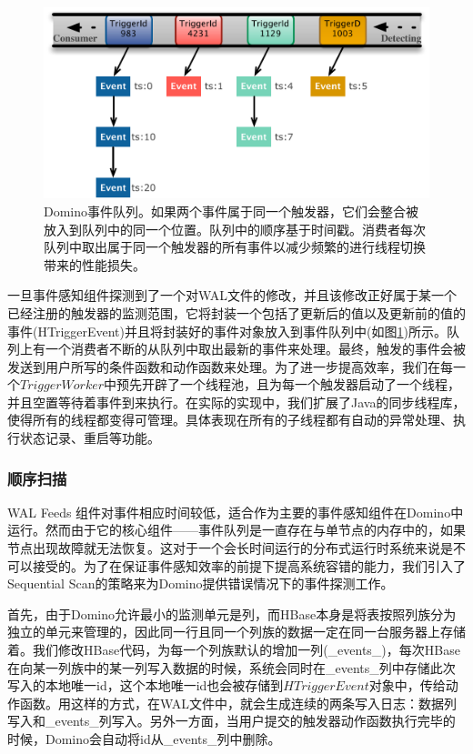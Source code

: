 \begin{figure}[]
\centering
\includegraphics[width=5in]{../figures/queue.pdf}
\caption{Domino事件队列。如果两个事件属于同一个触发器，它们会整合被放入到队列中的同一个位置。队列中的顺序基于时间戳。消费者每次队列中取出属于同一个触发器的所有事件以减少频繁的进行线程切换带来的性能损失。}
\label{figs:queue}
\end{figure}

一旦事件感知组件探测到了一个对WAL文件的修改，并且该修改正好属于某一个已经注册的触发器的监测范围，它将封装一个包括了更新后的值以及更新前的值的事件(HTriggerEvent)并且将封装好的事件对象放入到事件队列中(如图\ref{figs:queue})所示。队列上有一个消费者不断的从队列中取出最新的事件来处理。最终，触发的事件会被发送到用户所写的条件函数和动作函数来处理。为了进一步提高效率，我们在每一个$TriggerWorker$中预先开辟了一个线程池，且为每一个触发器启动了一个线程，并且空置等待着事件到来执行。在实际的实现中，我们扩展了Java的同步线程库，使得所有的线程都变得可管理。具体表现在所有的子线程都有自动的异常处理、执行状态记录、重启等功能。

\subsubsection{顺序扫描}
WAL Feeds 组件对事件相应时间较低，适合作为主要的事件感知组件在Domino中运行。然而由于它的核心组件——事件队列是一直存在与单节点的内存中的，如果节点出现故障就无法恢复。这对于一个会长时间运行的分布式运行时系统来说是不可以接受的。为了在保证事件感知效率的前提下提高系统容错的能力，我们引入了Sequential Scan的策略来为Domino提供错误情况下的事件探测工作。

首先，由于Domino允许最小的监测单元是列，而HBase本身是将表按照列族分为独立的单元来管理的，因此同一行且同一个列族的数据一定在同一台服务器上存储着。我们修改HBase代码，为每一个列族默认的增加一列(\_events\_)，每次HBase在向某一列族中的某一列写入数据的时候，系统会同时在\_events\_列中存储此次写入的本地唯一id，这个本地唯一id也会被存储到$HTriggerEvent$对象中，传给动作函数。用这样的方式，在WAL文件中，就会生成连续的两条写入日志：数据列写入和\_events\_列写入。另外一方面，当用户提交的触发器动作函数执行完毕的时候，Domino会自动将id从\_events\_列中删除。

